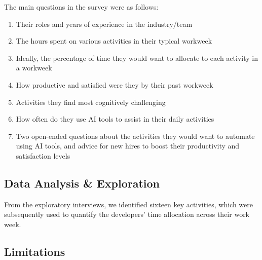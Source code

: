 The main questions in the survey were as follows:
\begin{enumerate}
    \item Their roles and years of experience in the industry/team
    \item The hours spent on various activities in their typical workweek
    \item Ideally, the percentage of time they would want to allocate to each activity in a workweek
    \item How productive and satisfied were they by their past workweek
    \item Activities they find most cognitively challenging
    \item How often do they use AI tools to assist in their daily activities
    \item Two open-ended questions about the activities they would want to automate using AI tools, and advice for new hires to boost their productivity and satisfaction levels 
\end{enumerate}



\subsection{Data Analysis \& Exploration}

From the exploratory interviews, we identified sixteen key activities, which were subsequently used to quantify the developers' time allocation across their work week. 

\subsection{Limitations}